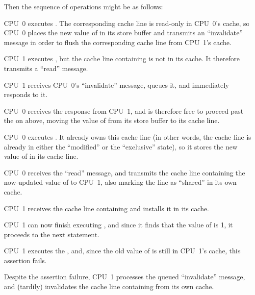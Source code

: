 Then the sequence of operations might be as follows:
\begin{fcvref}
\begin{sequence}
\item	CPU~0 executes .
	The corresponding cache line is read-only in CPU~0's cache, so
	CPU~0 places the new value of  in its store buffer and
	transmits an ``invalidate'' message in order to flush the
	corresponding cache line from CPU~1's cache.
	\label{seq:app:whymb:Invalidate Queues and Memory Barriers}
\item	CPU~1 executes , but the cache line
	containing  is not in its cache.
	It therefore transmits a ``read'' message.
\item	CPU~1 receives CPU~0's ``invalidate'' message, queues it, and
	immediately responds to it.
\item	CPU~0 receives the response from CPU~1, and is therefore free
	to proceed past the  on  above, moving
	the value of  from its store buffer to its cache line.
\item	CPU~0 executes .
	It already owns this cache line (in other words, the cache line
	is already in either the ``modified'' or the ``exclusive'' state),
	so it stores the new value of  in its cache line.
\item	CPU~0 receives the ``read'' message, and transmits the
	cache line containing the now-updated value of 
	to CPU~1, also marking the line as ``shared'' in its own cache.
\item	CPU~1 receives the cache line containing  and installs
	it in its cache.
\item	CPU~1 can now finish executing ,
	and since it finds that the value of  is 1, it proceeds
	to the next statement.
\item	CPU~1 executes the , and, since the
	old value of  is still in CPU~1's cache,
	this assertion fails.
\item	Despite the assertion failure, CPU~1 processes the queued
	``invalidate'' message, and (tardily)
	invalidates the cache line containing  from its own cache.
\end{sequence}
\end{fcvref}

\QuickQuizEnd

